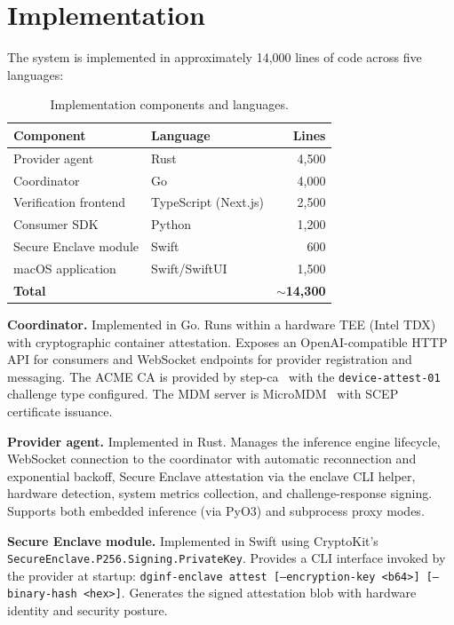 \documentclass[10pt,twocolumn,letterpaper]{article}
\begin{document}
\section{Implementation}
\label{sec:impl}

The system is implemented in approximately 14,000 lines of code across five languages:

\begin{table}[h]
\centering
\caption{Implementation components and languages.}
\vspace{4pt}
\small
\begin{tabular}{@{}llr@{}}
\toprule
\textbf{Component} & \textbf{Language} & \textbf{Lines} \\
\midrule
Provider agent & Rust & 4,500 \\
Coordinator & Go & 4,000 \\
Verification frontend & TypeScript (Next.js) & 2,500 \\
Consumer SDK & Python & 1,200 \\
Secure Enclave module & Swift & 600 \\
macOS application & Swift/SwiftUI & 1,500 \\
\midrule
\textbf{Total} && \textbf{$\sim$14,300} \\
\bottomrule
\end{tabular}
\end{table}

\textbf{Coordinator.} Implemented in Go. Runs within a hardware TEE (Intel TDX) with cryptographic container attestation. Exposes an OpenAI-compatible HTTP API for consumers and WebSocket endpoints for provider registration and messaging. The ACME CA is provided by step-ca~\cite{step-ca} with the \texttt{device-attest-01} challenge type configured. The MDM server is MicroMDM~\cite{micromdm} with SCEP certificate issuance.

\textbf{Provider agent.} Implemented in Rust. Manages the inference engine lifecycle, WebSocket connection to the coordinator with automatic reconnection and exponential backoff, Secure Enclave attestation via the enclave CLI helper, hardware detection, system metrics collection, and challenge-response signing. Supports both embedded inference (via PyO3) and subprocess proxy modes.

\textbf{Secure Enclave module.} Implemented in Swift using CryptoKit's \texttt{SecureEnclave.P256.Signing.PrivateKey}. Provides a CLI interface invoked by the provider at startup: \texttt{dginf-enclave attest [--encryption-key <b64>] [--binary-hash <hex>]}. Generates the signed attestation blob with hardware identity and security posture.
\end{document}
